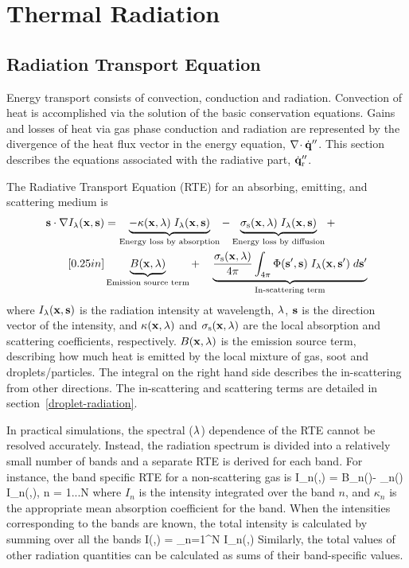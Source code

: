 

\chapter{Thermal Radiation}
\label{chapter:radiation}

\section{Radiation Transport Equation}

Energy transport consists of convection, conduction and
radiation. Convection of heat is accomplished via the solution of the
basic conservation equations. Gains and losses of heat via gas phase conduction
and radiation are represented by the divergence of the heat flux
vector in the energy equation, $\nabla\!\cdot \dot{\mathbf{q}}''$. This section
describes the equations associated with the radiative part, $\dot{\mathbf{q}}''_{\rm r}$.

The Radiative Transport Equation (RTE) for an absorbing, emitting, and scattering medium is
\begin{align}
{\mathbf{s}} \cdot \nabla I_{\lambda}({\mathbf{x}},{\mathbf{s}}) &=
\underbrace{ - \kappa({\mathbf{x}},\lambda)   \; I_\lambda({\mathbf{x}},{\mathbf{s}}) }_{\textrm{Energy loss by absorption}} -
\underbrace{\sigma_{\rm s}({\mathbf{x}},\lambda) \; I_\lambda({\mathbf{x}},{\mathbf{s}}) }_{\textrm{Energy loss by diffusion}} +  \notag \\ [0.25in]
& \underbrace{   B({\mathbf{x}},\lambda) }_{\textrm{Emission source term}} + \quad
\underbrace{   \frac{\sigma_{\rm s}({\mathbf{x}},\lambda)}{4\pi}
\int_{4\pi}\Phi({\mathbf{s}}',{\mathbf{s}}) \; I_{\lambda}({\mathbf{x}},{\mathbf{s}}') \; d{\mathbf{s}}'
 }_{\textrm{In-scattering term}}
\label{RTEbasic}
\end{align}
where $I_{\lambda}({\mathbf{x}},{\mathbf{s}})$ is the radiation intensity at wavelength,
$\lambda$, ${\mathbf{s}}$ is the direction vector of the intensity, and
$\kappa({\mathbf{x}},\lambda)$ and $\sigma_{\rm s}({\mathbf{x}},\lambda)$ are the local absorption
and scattering coefficients,
respectively. $B({\mathbf{x}},\lambda)$ is the emission source term, describing how much heat is emitted by the local mixture of gas, soot and droplets/particles.
The integral on the right hand side describes the in-scattering from other directions. The in-scattering and scattering terms are detailed in section~\ref{droplet-radiation}.

In practical simulations, the spectral ($\lambda$) dependence of the RTE cannot be resolved
accurately. Instead, the radiation spectrum is divided into a relatively small number of bands and a separate RTE is derived for
each band. For instance, the band specific RTE for a non-scattering gas is
\be   \bs \cdot \nabla I_n(\bx,\bs) = B_n(\bx)- \kappa_n(\bx) I_n(\bx,\bs),\;\; n = 1...N
\label{bandRTE} \ee
where $I_n$ is the intensity integrated over the band $n$, and $\kappa_n$
is the appropriate mean absorption coefficient for the band. When the intensities corresponding to the bands are known, the total
intensity is calculated by summing over all the bands
\be
   I(\bx,\bs) = \sum_{n=1}^N I_n(\bx,\bs)
\ee
Similarly, the total values of other radiation quantities can be calculated as sums of their band-specific values.

